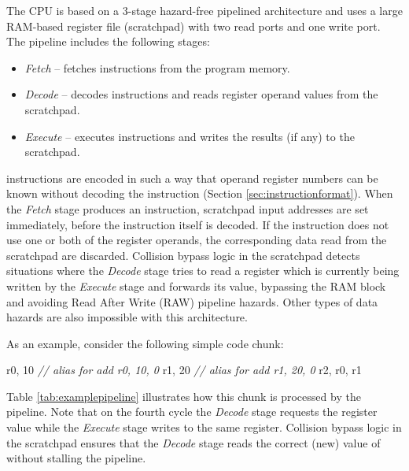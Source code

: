 \documentclass[a4paper,12pt,twoside,extrafontsizes]{memoir}
\begin{document}
The \lxp{} CPU is based on a 3-stage hazard-free pipelined architecture and uses a large RAM-based register file (scratchpad) with two read ports and one write port. The pipeline includes the following stages:

\begin{itemize}
	\item\emph{Fetch} -- fetches instructions from the program memory.
	\item\emph{Decode} -- decodes instructions and reads register operand values from the scratchpad.
	\item\emph{Execute} -- executes instructions and writes the results (if any) to the scratchpad.
\end{itemize}

\lxp{} instructions are encoded in such a way that operand register numbers can be known without decoding the instruction (Section \ref{sec:instructionformat}). When the \emph{Fetch} stage produces an instruction, scratchpad input addresses are set immediately, before the instruction itself is decoded. If the instruction does not use one or both of the register operands, the corresponding data read from the scratchpad are discarded. Collision bypass logic in the scratchpad detects situations where the \emph{Decode} stage tries to read a register which is currently being written by the \emph{Execute} stage and forwards its value, bypassing the RAM block and avoiding Read After Write (RAW) pipeline hazards. Other types of data hazards are also impossible with this architecture.

As an example, consider the following simple code chunk:

\begin{codepar}
     r0, 10 \emph{// alias for add r0, 10, 0}
     r1, 20 \emph{// alias for add r1, 20, 0}
     r2, r0, r1
\end{codepar}

Table \ref{tab:examplepipeline} illustrates how this chunk is processed by the \lxp{} pipeline. Note that on the fourth cycle the \emph{Decode} stage requests the  register value while the \emph{Execute} stage writes to the same register. Collision bypass logic in the scratchpad ensures that the \emph{Decode} stage reads the correct (new) value of  without stalling the pipeline.
\end{document}

